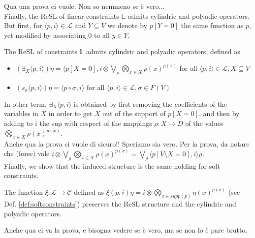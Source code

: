 \documentclass{llncs}
\begin{document}
{Qua una prova ci vuole. Non so nemmeno se \`e vero...
\\

Finally, the ReSL of linear constraints $\mathbb{L}$ admits cylindric and polyadic operators. But first, for 
$ \langle p, i \rangle \in \mathcal{L}$ and $Y \subseteq V$ we denote by
$p[Y=0]$ the same function as $p$, yet modified by associating $0$ to all $y \in Y$.


\begin{lemma}
	The ReSL of constraints $\mathbb{L}$ admits cylindric and polyadic operators, defined as
	\begin{itemize}
		\item  $(\exists_X \langle p, i \rangle) \eta = \langle p[X = 0], i \otimes \bigvee_{\rho} \bigotimes_{x \in X} \rho(x)^{p(x)}$
		         for all $ \langle p, i \rangle \in \mathcal{L}, X \subseteq V$
		\item  $(s_\sigma \langle p, i \rangle) \eta = \langle p \circ \sigma, i \rangle$ for all $\langle p, i \rangle \in \mathcal{L}, \sigma \in F(V)$		
	\end{itemize}
\end{lemma}

In other term, $\exists_X \langle p, i \rangle$ is obtained by first removing the coefficients of the variables in $X$
in order to get $X$ out of the support of $p[X = 0]$, and then by adding to $i$ the sup with respect of the 
mappings $\rho: X \rightarrow D$ of the values $\bigotimes_{x \in X} \rho(x)^{p(x)}$.
\\

Anche qua la prova ci vuole di sicuro!! Speriamo sia vero. Per la prova, 
da notare che (forse) vale
$i \otimes \bigvee_{\rho} \bigotimes_{x \in X} \rho(x)^{p(x)} 
=
\bigvee_{\rho} \langle p[V\setminus X = 0], i \rangle \rho$.
\\

Finally, we show that the induced structure is the same holding for soft constraints.

\begin{proposition}
The function $\xi: \mathcal{L} \rightarrow \mathcal{C}$ defined as
$\xi(p,i)\eta = i \otimes \bigotimes_{x \in supp(p)} \eta(x)^{p(x)}$
(see Def. \ref{def:softconstraints})
preserves the ReSL structure and the cylindric and polyadic operators.
\end{proposition}

Anche qua ci va la prova, e bisogna vedere se \`e vero, ma se non lo \`e pare brutto.
}
\end{document}
